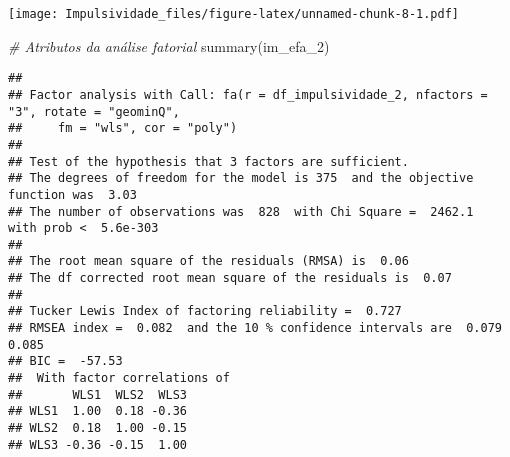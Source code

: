 \documentclass[
]{article}
\newenvironment{Shaded}{\begin{snugshade}}{\end{snugshade}}
\newcommand{\CommentTok}[1]{\textcolor[rgb]{0.56,0.35,0.01}{\textit{#1}}}
\newcommand{\DecValTok}[1]{\textcolor[rgb]{0.00,0.00,0.81}{#1}}
\newcommand{\FunctionTok}[1]{\textcolor[rgb]{0.00,0.00,0.00}{#1}}
\newcommand{\NormalTok}[1]{#1}
\newcommand{\SpecialCharTok}[1]{\textcolor[rgb]{0.00,0.00,0.00}{#1}}
\begin{document}
\texttt{[image: Impulsividade\_files/figure-latex/unnamed-chunk-8-1.pdf]}

\begin{Shaded}
\begin{Highlighting}[]
\CommentTok{\# Atributos da análise fatorial}
\FunctionTok{summary}\NormalTok{(im\_efa\_2)}
\end{Highlighting}
\end{Shaded}

\begin{verbatim}
## 
## Factor analysis with Call: fa(r = df_impulsividade_2, nfactors = "3", rotate = "geominQ", 
##     fm = "wls", cor = "poly")
## 
## Test of the hypothesis that 3 factors are sufficient.
## The degrees of freedom for the model is 375  and the objective function was  3.03 
## The number of observations was  828  with Chi Square =  2462.1  with prob <  5.6e-303 
## 
## The root mean square of the residuals (RMSA) is  0.06 
## The df corrected root mean square of the residuals is  0.07 
## 
## Tucker Lewis Index of factoring reliability =  0.727
## RMSEA index =  0.082  and the 10 % confidence intervals are  0.079 0.085
## BIC =  -57.53
##  With factor correlations of 
##       WLS1  WLS2  WLS3
## WLS1  1.00  0.18 -0.36
## WLS2  0.18  1.00 -0.15
## WLS3 -0.36 -0.15  1.00
\end{verbatim}

\begin{Shaded}
\end{Shaded}
\end{document}
